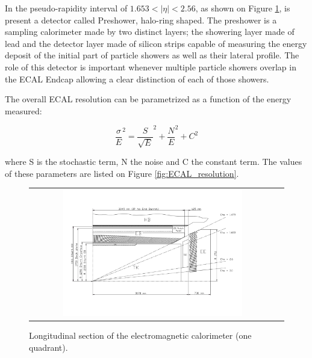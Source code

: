 In the pseudo-rapidity interval of $1.653 < |\eta| < 2.56$, as shown on Figure \ref{fig:ECAL_section}, is present a detector called Preshower, halo-ring shaped. The preshower is a sampling calorimeter made by two distinct layers; the showering layer made of lead and the detector layer made of silicon strips capable of measuring the energy deposit of the initial part of particle showers as well as their lateral profile. The role of this detector is important whenever multiple particle showers overlap in the ECAL Endcap allowing a clear distinction of each of those showers.

The overall ECAL resolution can be parametrized as a function of the energy measured:

\begin{equation}
\dfrac{\sigma}{E}^{2} = \dfrac{S}{\sqrt{E}}^{2} + \dfrac{N}{E}^{2} + C^{2}
\end{equation}

where S is the stochastic term, N the noise and C the constant term. The values of these
parameters are listed on Figure \ref{fig:ECAL_resolution}.  

\begin{figure}[tbh!]
	\centering
	\begin{tabular}{cc}
		\includegraphics[width=0.75\textwidth]{detector/pics/ECAL_section.pdf}
	\end{tabular}
	\caption{Longitudinal section of the electromagnetic calorimeter (one quadrant).}
	\label{fig:ECAL_section}
\end{figure}

